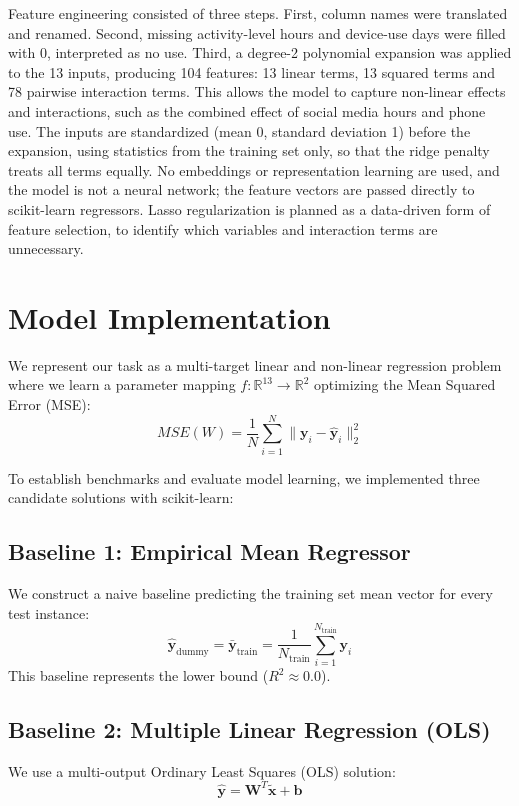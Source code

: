 \documentclass[11pt]{article}
\begin{document}
Feature engineering consisted of three steps. First, column names were translated and renamed. Second, missing activity-level hours and device-use days were filled with 0, interpreted as no use. Third, a degree-2 polynomial expansion was applied to the 13 inputs, producing 104 features: 13 linear terms, 13 squared terms and 78 pairwise interaction terms. This allows the model to capture non-linear effects and interactions, such as the combined effect of social media hours and phone use. The inputs are standardized (mean 0, standard deviation 1) before the expansion, using statistics from the training set only, so that the ridge penalty treats all terms equally. No embeddings or representation learning are used, and the model is not a neural network; the feature vectors are passed directly to scikit-learn regressors. Lasso regularization is planned as a data-driven form of feature selection, to identify which variables and interaction terms are unnecessary.

\section{Model Implementation}
\label{sec:impl}

We represent our task as a multi-target linear and non-linear regression problem where we learn a parameter mapping $f: \mathbb{R}^{13} \to \mathbb{R}^2$ optimizing the Mean Squared Error (MSE):
\begin{equation}
    MSE(W) = \frac{1}{N} \sum_{i=1}^N \|\mathbf{y}_i - \hat{\mathbf{y}}_i\|_2^2
\end{equation}

To establish benchmarks and evaluate model learning, we implemented three candidate solutions with scikit-learn:

\subsection{Baseline 1: Empirical Mean Regressor}
We construct a naive baseline predicting the training set mean vector for every test instance:
\begin{equation}
    \hat{\mathbf{y}}_{\text{dummy}} = \bar{\mathbf{y}}_{\text{train}} = \frac{1}{N_{\text{train}}} \sum_{i=1}^{N_{\text{train}}} \mathbf{y}_i
\end{equation}
This baseline represents the lower bound ($R^2 \approx 0.0$).

\subsection{Baseline 2: Multiple Linear Regression (OLS)}
We use a multi-output Ordinary Least Squares (OLS) solution:
\begin{equation}
    \hat{\mathbf{y}} = \mathbf{W}^T \tilde{\mathbf{x}} + \mathbf{b}
\end{equation}
\end{document}
